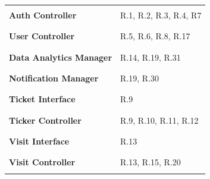 \documentclass[a4paper, 12pt, oneside, table]{article}
\begin{document}
\begin{tabularx}{\linewidth}{| g || p{10cm} |}
    \hline
    \rule{0pt}{15pt}& \\
    \large{\textbf{Auth Controller}} &  R.1, R.2, R.3, R.4, R7\\
    & \\
    \hline
    \rule{0pt}{15pt}& \\
    \large{\textbf{User Controller}} &  R.5, R.6, R.8, R.17 \\
    & \\
    \hline
    \rule{0pt}{15pt}& \\
    \large{\textbf{Data Analytics Manager}} &  R.14, R.19, R.31\\
    & \\
    \hline
     \rule{0pt}{15pt}& \\
    \large{\textbf{Notification Manager}} &  R.19, R.30\\
    & \\
    \hline
    \rule{0pt}{15pt}& \\
    \large{\textbf{Ticket Interface}} &  R.9\\
    & \\
    \hline
    \rule{0pt}{15pt}& \\
    \large{\textbf{Ticker Controller}} &  R.9, R.10, R.11, R.12\\
    & \\
    \hline
    \rule{0pt}{15pt}& \\
    \large{\textbf{Visit Interface}} &  R.13\\
    & \\
    \hline
    \rule{0pt}{15pt}& \\
    \large{\textbf{Visit Controller}} &  R.13, R.15, R.20\\
    & \\

\end{tabularx}
\end{document}

